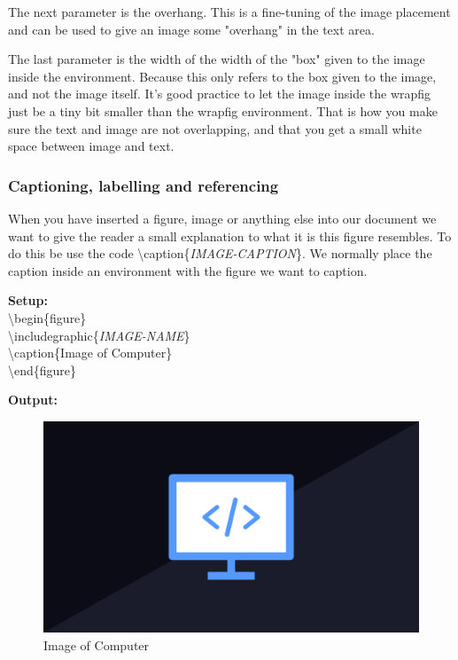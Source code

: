 \documentclass{article}
\newcommand{\bs}[1]{\textbackslash{}#1} %
\begin{document}
The next parameter is the overhang. This is a fine-tuning of the image placement and can be used to give an image some "overhang" in the text area. 

The last parameter is the width of the width of the "box" given to the image inside the environment. Because this only refers to the box given to the image, and not the image itself.
It's good practice to let the image inside the wrapfig just be a tiny bit smaller than the wrapfig environment. That is how you make sure the text and image are not overlapping, and that you
get a small white space between image and text.

\subsubsection{Captioning, labelling and referencing}
When you have inserted a figure, image or anything else into our document we want to give the reader a small explanation to what
it is this figure resembles. To do this be use the code \bs{caption\{\textit{IMAGE-CAPTION}\}}.
We normally place the caption inside an environment with the figure we want to caption. 

\begin{multicols}{2}
    \vspace{0.5em}
    \noindent
    \textbf{Setup:} \\
    \bs{begin\{figure\}} \\
    \bs{includegraphic\{\textit{IMAGE-NAME}\}} \\
    \bs{caption\{Image of Computer\}} \\
    \bs{end\{figure\}} \\
    \columnbreak

    \vspace{0.5em}
    \noindent
    \textbf{Output:}
    \begin{figure}[H]
        \includegraphics[scale=0.1]{Images/Programming.png}
        \caption{Image of Computer}
        \label{fig:image_of_computer_caption}
    \end{figure}
\end{multicols}
\end{document}
